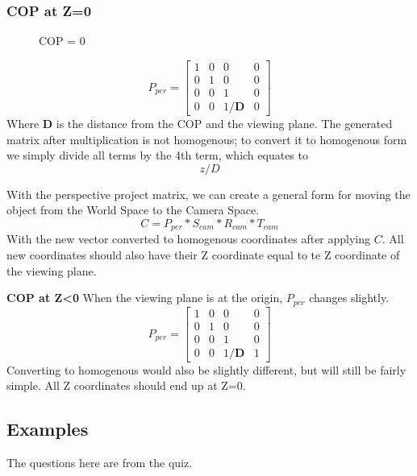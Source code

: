 \subsubsection{COP at Z=0}
\begin{figure}[!htb]
	\caption{\label{fig:trianglesZ0} COP = 0}
\end{figure}
\begin{equation}
\label{eqn:proj0}
P_{per} = \begin{bmatrix}
1 & 0 & 0 & 0\\ 
0 & 1 & 0 & 0\\ 
0 & 0 & 1 & 0\\
0 & 0 & 1/\mathbf{D} & 0 
\end{bmatrix}
\end{equation}
Where \textbf{D} is the distance from the COP and the viewing plane. The generated matrix after multiplication is not homogenous; to convert it to homogenous form we simply divide all terms by the 4th term, which equates to \[z/D\]

With the perspective project matrix, we can create a general form for moving the object from the World Space to the Camera Space.
\begin{equation}
\label{eqn:worldToCam1}
C = P_{per} * S_{cam} * R_{cam} * T_{cam}
\end{equation}
With the new vector converted to homogenous coordinates after applying $C$.
All new coordinates should also have their Z coordinate equal to te Z coordinate of the viewing plane.

\textbf{COP at Z<0}
When the viewing plane is at the origin, $P_{per}$ changes slightly.
\begin{equation}
\label{eqn:proj1}
P_{per} = \begin{bmatrix}
1 & 0 & 0 & 0\\ 
0 & 1 & 0 & 0\\ 
0 & 0 & 1 & 0\\
0 & 0 & 1/\mathbf{D} & 1 
\end{bmatrix}
\end{equation}
Converting to homogenous would also be slightly different, but will still be fairly simple.
All Z coordinates should end up at Z=0.

\subsection{Examples}

The questions here are from the quiz.

